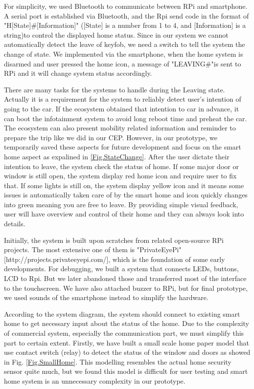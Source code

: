 For simplicity, we used Bluetooth to communicate between RPi and smartphone. A serial port is established via Bluetooth, and the Rpi send code in the format of "H[State]\#[Information]" ([State] is a number from 1 to 4, and [Information] is a string)to control the displayed home status. Since in our system we cannot automatically detect the leave of keyfob, we need a switch to tell the system the change of state. We implemented via the smartphone, when the home system is disarmed and user pressed the home icon, a message of "LEAVING\#"is sent to RPi and it will change system status accordingly.

There are many tasks for the systems to handle during the Leaving state. Actually it is a requirement for the system to reliably detect user's intention of going to the car. If the ecosystem obtained that intention to car in advance, it can boot the infotainment system to avoid long reboot time and preheat the car. The ecosystem can also present mobility related information and reminder to prepare the trip like we did in our CEP. However, in our prototype, we temporarily saved these aspects for future development and focus on the smart home aspect as expalined in \ref{Fig.StateChange}. After the user dictate their intention to leave, the system check the status of home. If some major door or window is still open, the system display red home icon and require user to fix that. If some lights is still on, the system display yellow icon and it means some issues is automatically taken care of by the smart home and icon quickly changes into green meaning you are free to leave. By providing simple visual feedback, user will have overview and control of their home and they can always look into details.

Initially, the system is built upon scratches from related open-source RPi  projects. The most extensive one of them is "PrivateEyePi" [http://projects.privateeyepi.com/], which is the foundation of some early developments. For debugging, we built a system  that connects LEDs, buttons, LCD to Rpi. But we later abandoned those and transferred most of the interface to the touchscreen. We have also attached buzzer to RPi, but for final prototype, we used sounds of the smartphone instead to simplify the hardware. 

According to the system diagram, the system should connect to existing smart home to get necessary input about the status of the home. Due to the complexity of commercial system, especially the communication part, we must simplify this part to certain extent. Firstly, we have built a small scale home paper model that use contact switch (relay) to detect the status of the window and doors as showed in Fig. \ref{Fig.SmallHome}. This modelling resembles the actual home security sensor quite much, but we found this model is difficult for user testing and smart home system is an unnecessary complexity in our prototype.

